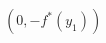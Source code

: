 \documentclass[preview]{standalone}
\begin{document}
\begin{center}
$(0, -f^*(y_1))$
\end{center}
\end{document}

